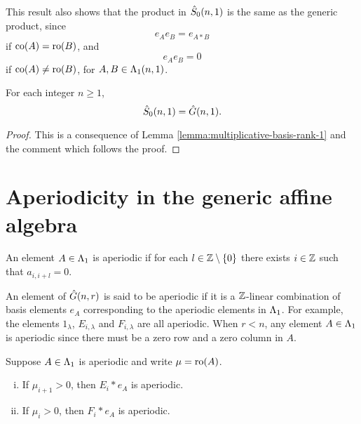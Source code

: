 \documentclass[a4paper, 11pt, twoside]{report}
\begin{document}
This result also shows that the product in $\zeroschur[n,1]$ is the same as the generic product, since
\begin{equation*}
e_A e_B = e_{A\ast B}
\end{equation*}
if $\co{A}=\ro{B}$, and
\begin{equation*}
e_A e_B = 0
\end{equation*}
if $\co{A}\neq\ro{B}$, for $A,B\in\matrices[(n,1)]$.

\begin{corollary}\label{lemma:generic-zero-schur-same-in-rank-1}
For each integer $n\geq 1$,
\begin{equation*}
\zeroschur[n,1] = \generic[n,1].
\end{equation*}
\end{corollary}

\begin{proof}
This is a consequence of Lemma \ref{lemma:multiplicative-basis-rank-1} and the comment which follows the proof.
\end{proof}


\section{Aperiodicity in the generic affine algebra}


\begin{definition}\label{def:aperiodic}
An element $A\in\matrices$ is aperiodic if for each $l\in\integers\setminus\{0\}$ there exists $i\in\integers$ such that $a_{i,i+l}=0$.
\end{definition}

An element of $\generic$ is said to be aperiodic if it is a $\integers$-linear combination of basis elements $e_A$ corresponding to the aperiodic elements in $\matrices$. For example, the elements $1_\lambda$, $E_{i,\lambda}$ and $F_{i,\lambda}$ are all aperiodic.
When $r<n$, any element $A\in\matrices$ is aperiodic since there must be a zero row and a zero column in $A$.

\begin{lemma}\label{lemma:words-are-aperiodic}
Suppose $A\in\matrices$ is aperiodic and write $\mu=\ro{A}$.
\begin{enumerate}[i.]
\item
If $\mu_{i+1}>0$, then $E_i\ast e_A$ is aperiodic.
\item
If $\mu_i>0$, then $F_i\ast e_A$ is aperiodic.
\end{enumerate}
\end{lemma}
\end{document}
